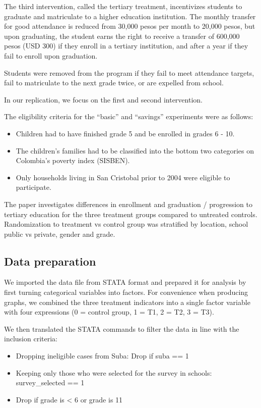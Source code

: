 \documentclass[
]{article}
\providecommand{\tightlist}{%
  \setlength{\itemsep}{0pt}\setlength{\parskip}{0pt}}
\begin{document}
The third intervention, called the tertiary treatment, incentivizes
students to graduate and matriculate to a higher education institution.
The monthly transfer for good attendance is reduced from 30,000 pesos
per month to 20,000 pesos, but upon graduating, the student earns the
right to receive a transfer of 600,000 pesos (USD 300) if they enroll in
a tertiary institution, and after a year if they fail to enroll upon
graduation.

Students were removed from the program if they fail to meet attendance
targets, fail to matriculate to the next grade twice, or are expelled
from school.

In our replication, we focus on the first and second intervention.

The eligibility criteria for the ``basic'' and ``savings'' experiments
were as follows:

\begin{itemize}
\tightlist
\item
  Children had to have finished grade 5 and be enrolled in grades 6 -
  10.
\item
  The children's families had to be classified into the bottom two
  categories on Colombia's poverty index (SISBEN).
\item
  Only households living in San Cristobal prior to 2004 were eligible to
  participate.
\end{itemize}

The paper investigates differences in enrollment and graduation /
progression to tertiary education for the three treatment groups
compared to untreated controls. Randomization to treatment vs control
group was stratified by location, school public vs private, gender and
grade.

\hypertarget{data-preparation}{%
\subsection{Data preparation}\label{data-preparation}}

We imported the data file from STATA format and prepared it for analysis
by first turning categorical variables into factors. For convenience
when producing graphs, we combined the three treatment indicators into a
single factor variable with four expressions (0 = control group, 1 = T1,
2 = T2, 3 = T3).

We then translated the STATA commands to filter the data in line with
the inclusion criteria:

\begin{itemize}
\tightlist
\item
  Dropping ineligible cases from Suba: Drop if suba == 1
\item
  Keeping only those who were selected for the survey in schools:
  survey\_selected == 1
\item
  Drop if grade is \textless{} 6 or grade is 11
\end{itemize}
\end{document}
